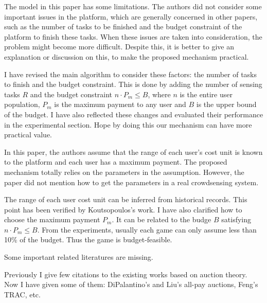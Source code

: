 \documentclass[a4paper,11pt]{exam}
\begin{document}
\begin{questions}
\question The model in this paper has some limitations. The authors did not consider some important issues in the platform, which are generally concerned in other papers, such as the number of tasks to be finished and the budget constraint of the platform to finish these tasks. When these issues are taken into consideration, the problem might become more difficult. Despite this, it is better to give an explanation or discussion on this, to make the proposed mechanism practical. 
\begin{solution}
I have revised the main algorithm to consider these factors: the number of tasks to finish and the budget constraint. This is done by adding the number of sensing tasks $R$ and the budget constraint $n\cdot P_m \leq B$, where $n$ is the entire user population, $P_m$ is the maximum payment to any user and $B$ is the upper bound of the budget. I have also reflected these changes and evaluated their performance in the experimental section. Hope by doing this our mechanism can have more practical value.
\end{solution}

\question In this paper, the authors assume that the range of each user’s cost unit is known to the platform and each user has a maximum payment. The proposed mechanism totally relies on the parameters in the assumption. However, the paper did not mention how to get the parameters in a real crowdsensing system.
\begin{solution}
The range of each user cost unit can be inferred from historical records. This point has been verified by Koutsopoulos's work. I have also clarified how to choose the maximum payment $P_m$. It can be related to the budge $B$ satisfying $n\cdot P_m \leq B$. From the experiments, usually each game can only assume less than 10\% of the budget. Thus the game is budget-feasible. 
\end{solution}

\question Some important related literatures are missing.
\begin{solution}
Previously I give few citations to the existing works based on auction theory. Now I have given some of them: DiPalantino's and Liu's all-pay auctions, Feng's TRAC, etc.
\end{solution}


\end{questions}
\end{document}
